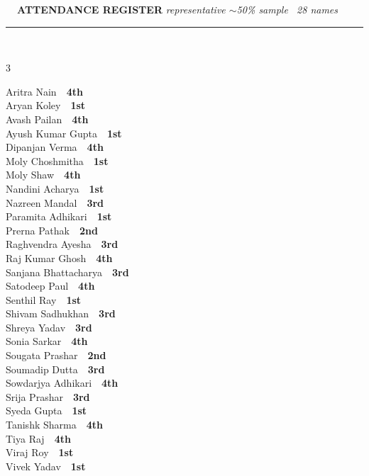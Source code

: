 \documentclass[11pt,a4paper]{article}
\begin{document}
\vspace{3pt}\noindent
{\footnotesize\bfseries\color{Slate}\faListOl~~ATTENDANCE REGISTER}%
\hfill{\scriptsize\itshape\color{Slate}representative $\sim$50\% sample \textperiodcentered\ 28 names}\\[3pt]
{\color{Line}\rule{\linewidth}{0.5pt}}\\[5pt]
\begingroup\footnotesize\setlength{\columnsep}{20pt}\setlength{\parskip}{1pt}%
\begin{multicols}{3}\raggedright
Aritra Nain~\dotfill~\textbf{4th}\\
Aryan Koley~\dotfill~\textbf{1st}\\
Avash Pailan~\dotfill~\textbf{4th}\\
Ayush Kumar Gupta~\dotfill~\textbf{1st}\\
Dipanjan Verma~\dotfill~\textbf{4th}\\
Moly Choshmitha~\dotfill~\textbf{1st}\\
Moly Shaw~\dotfill~\textbf{4th}\\
Nandini Acharya~\dotfill~\textbf{1st}\\
Nazreen Mandal~\dotfill~\textbf{3rd}\\
Paramita Adhikari~\dotfill~\textbf{1st}\\
Prerna Pathak~\dotfill~\textbf{2nd}\\
Raghvendra Ayesha~\dotfill~\textbf{3rd}\\
Raj Kumar Ghosh~\dotfill~\textbf{4th}\\
Sanjana Bhattacharya~\dotfill~\textbf{3rd}\\
Satodeep Paul~\dotfill~\textbf{4th}\\
Senthil Ray~\dotfill~\textbf{1st}\\
Shivam Sadhukhan~\dotfill~\textbf{3rd}\\
Shreya Yadav~\dotfill~\textbf{3rd}\\
Sonia Sarkar~\dotfill~\textbf{4th}\\
Sougata Prashar~\dotfill~\textbf{2nd}\\
Soumadip Dutta~\dotfill~\textbf{3rd}\\
Sowdarjya Adhikari~\dotfill~\textbf{4th}\\
Srija Prashar~\dotfill~\textbf{3rd}\\
Syeda Gupta~\dotfill~\textbf{1st}\\
Tanishk Sharma~\dotfill~\textbf{4th}\\
Tiya Raj~\dotfill~\textbf{4th}\\
Viraj Roy~\dotfill~\textbf{1st}\\
Vivek Yadav~\dotfill~\textbf{1st}\\
\end{multicols}
\endgroup
\end{document}
